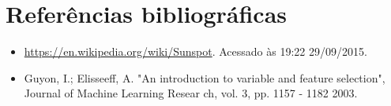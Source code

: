 \section* {Referências bibliográficas}
\begin {itemize}
  \item \url{https://en.wikipedia.org/wiki/Sunspot}. Acessado às 19:22 29/09/2015.
  \item Guyon, I.; Elisseeff, A. "An introduction to variable and feature selection", Journal of Machine Learning Resear ch, vol. 3, pp. 1157 - 1182 2003.
\end{itemize}